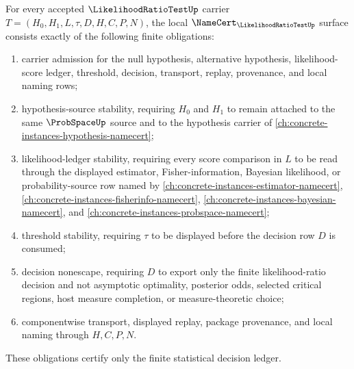 \begin{theorem}\label{thm:likelihood-ratio-test-namecert-obligations}
For every accepted $\LikelihoodRatioTestUp$ carrier $T=(H_0,H_1,L,\tau,D,H,C,P,N)$, the local $\NameCert_{\LikelihoodRatioTestUp}$ surface consists exactly of the following finite obligations:
\begin{enumerate}
\item carrier admission for the null hypothesis, alternative hypothesis, likelihood-score ledger, threshold, decision, transport, replay, provenance, and local naming rows;
\item hypothesis-source stability, requiring $H_0$ and $H_1$ to remain attached to the same $\ProbSpaceUp$ source and to the hypothesis carrier of \autoref{ch:concrete-instances-hypothesis-namecert};
\item likelihood-ledger stability, requiring every score comparison in $L$ to be read through the displayed estimator, Fisher-information, Bayesian likelihood, or probability-source row named by \autoref{ch:concrete-instances-estimator-namecert}, \autoref{ch:concrete-instances-fisherinfo-namecert}, \autoref{ch:concrete-instances-bayesian-namecert}, and \autoref{ch:concrete-instances-probspace-namecert};
\item threshold stability, requiring $\tau$ to be displayed before the decision row $D$ is consumed;
\item decision nonescape, requiring $D$ to export only the finite likelihood-ratio decision and not asymptotic optimality, posterior odds, selected critical regions, host measure completion, or measure-theoretic choice;
\item componentwise transport, displayed replay, package provenance, and local naming through $H,C,P,N$.
\end{enumerate}
These obligations certify only the finite statistical decision ledger.
\end{theorem}
